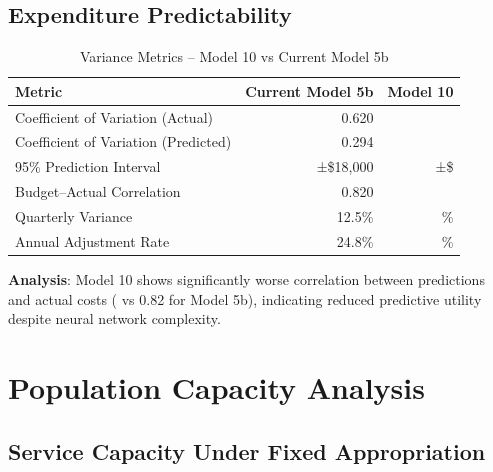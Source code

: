 \subsection{Expenditure Predictability}

\begin{table}[h]
\centering
\caption{Variance Metrics -- Model 10 vs Current Model 5b}
\begin{tabular}{lrr}
\toprule
\textbf{Metric} & \textbf{Current Model 5b} & \textbf{Model 10} \\
\midrule
Coefficient of Variation (Actual) & 0.620 & \ModelTenCVActual{} \\
Coefficient of Variation (Predicted) & 0.294 & \ModelTenCVPredicted{} \\
95\% Prediction Interval & ±\$18,000 & ±\$\ModelTenPredictionInterval{} \\
Budget--Actual Correlation & 0.820 & \ModelTenBudgetActualCorr{} \\
Quarterly Variance & 12.5\% & \ModelTenQuarterlyVariance{}\% \\
Annual Adjustment Rate & 24.8\% & \ModelTenAnnualAdjustmentRate{}\% \\
\bottomrule
\end{tabular}
\end{table}

\textbf{Analysis}: Model 10 shows significantly worse correlation between predictions and actual costs (\ModelTenBudgetActualCorr{} vs 0.82 for Model 5b), indicating reduced predictive utility despite neural network complexity.

\section{Population Capacity Analysis}

\subsection{Service Capacity Under Fixed Appropriation}

